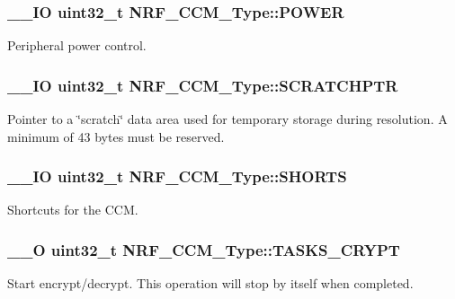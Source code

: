 \subsubsection[{P\+O\+W\+E\+R}]{\setlength{\rightskip}{0pt plus 5cm}\+\_\+\+\_\+\+I\+O uint32\+\_\+t N\+R\+F\+\_\+\+C\+C\+M\+\_\+\+Type\+::\+P\+O\+W\+E\+R}\label{struct_n_r_f___c_c_m___type_ae2b5e83f5566c69365245dd8e639bd7c}
Peripheral power control. \hypertarget{struct_n_r_f___c_c_m___type_ad59cdb8722760eb4506c7c1d7176ba48}{}
\subsubsection[{S\+C\+R\+A\+T\+C\+H\+P\+T\+R}]{\setlength{\rightskip}{0pt plus 5cm}\+\_\+\+\_\+\+I\+O uint32\+\_\+t N\+R\+F\+\_\+\+C\+C\+M\+\_\+\+Type\+::\+S\+C\+R\+A\+T\+C\+H\+P\+T\+R}\label{struct_n_r_f___c_c_m___type_ad59cdb8722760eb4506c7c1d7176ba48}
Pointer to a \char`\"{}scratch\char`\"{} data area used for temporary storage during resolution. A minimum of 43 bytes must be reserved. \hypertarget{struct_n_r_f___c_c_m___type_a8e9009050d486669c06040e3fbb03480}{}
\subsubsection[{S\+H\+O\+R\+T\+S}]{\setlength{\rightskip}{0pt plus 5cm}\+\_\+\+\_\+\+I\+O uint32\+\_\+t N\+R\+F\+\_\+\+C\+C\+M\+\_\+\+Type\+::\+S\+H\+O\+R\+T\+S}\label{struct_n_r_f___c_c_m___type_a8e9009050d486669c06040e3fbb03480}
Shortcuts for the C\+C\+M. \hypertarget{struct_n_r_f___c_c_m___type_ae0bdba9d36b8e92042c5e654010abd3d}{}
\subsubsection[{T\+A\+S\+K\+S\+\_\+\+C\+R\+Y\+P\+T}]{\setlength{\rightskip}{0pt plus 5cm}\+\_\+\+\_\+\+O uint32\+\_\+t N\+R\+F\+\_\+\+C\+C\+M\+\_\+\+Type\+::\+T\+A\+S\+K\+S\+\_\+\+C\+R\+Y\+P\+T}\label{struct_n_r_f___c_c_m___type_ae0bdba9d36b8e92042c5e654010abd3d}
Start encrypt/decrypt. This operation will stop by itself when completed. \hypertarget{struct_n_r_f___c_c_m___type_a36ed958edc61a58b5897f264d46e52f0}{}
